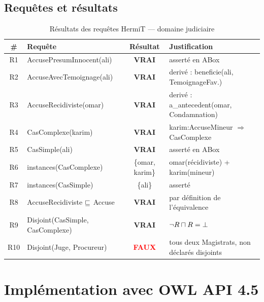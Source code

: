 \subsection{Requêtes et résultats}

\begin{table}[H]
\centering
\caption{Résultats des requêtes HermiT — domaine judiciaire}
\begin{tabularx}{\linewidth}{clcX}
\toprule
\textbf{\#} & \textbf{Requête} & \textbf{Résultat} & \textbf{Justification} \\
\midrule
R1 & AccusePresumInnocent(ali)    & \textcolor{codegreen}{\textbf{VRAI}}  & asserté en ABox \\
R2 & AccuseAvecTemoignage(ali)    & \textcolor{codegreen}{\textbf{VRAI}}  & derivé : beneficie(ali, TemoignageFav.) \\
R3 & AccuseRecidiviste(omar)      & \textcolor{codegreen}{\textbf{VRAI}}  & derivé : a\_antecedent(omar, Condamnation) \\
R4 & CasComplexe(karim)           & \textcolor{codegreen}{\textbf{VRAI}}  & karim:AccuseMineur $\Rightarrow$ CasComplexe \\
R5 & CasSimple(ali)               & \textcolor{codegreen}{\textbf{VRAI}}  & asserté en ABox \\
R6 & instances(CasComplexe)       & \{omar, karim\}                       & omar(récidiviste) + karim(mineur) \\
R7 & instances(CasSimple)         & \{ali\}                               & asserté \\
R8 & AccuseRecidiviste $\sqsubseteq$ Accuse & \textcolor{codegreen}{\textbf{VRAI}} & par définition de l'équivalence \\
R9 & Disjoint(CasSimple, CasComplexe) & \textcolor{codegreen}{\textbf{VRAI}} & $\lnot R \sqcap R = \bot$ \\
R10 & Disjoint(Juge, Procureur)   & \textcolor{red}{\textbf{FAUX}}        & tous deux Magistrats, non déclarés disjoints \\
\bottomrule
\end{tabularx}
\end{table}

\section{Implémentation avec OWL API 4.5}

